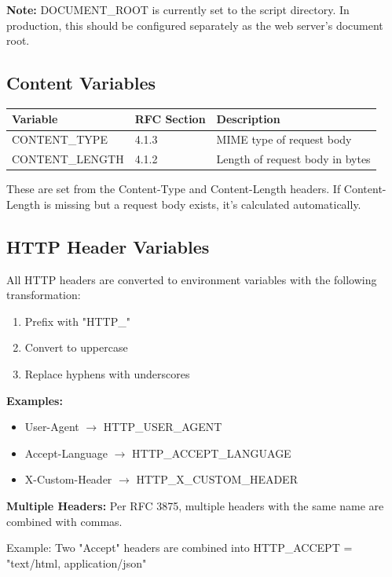 \documentclass[11pt,a4paper]{article}
\begin{document}
\textbf{Note:} DOCUMENT\_ROOT is currently set to the script directory. In production, this should be configured separately as the web server's document root.

\subsection{Content Variables}

\begin{tabular}{|l|l|p{6cm}|}
\hline
\textbf{Variable} & \textbf{RFC Section} & \textbf{Description} \\
\hline
CONTENT\_TYPE & 4.1.3 & MIME type of request body \\
\hline
CONTENT\_LENGTH & 4.1.2 & Length of request body in bytes \\
\hline
\end{tabular}

These are set from the Content-Type and Content-Length headers. If Content-Length is missing but a request body exists, it's calculated automatically.

\subsection{HTTP Header Variables}

All HTTP headers are converted to environment variables with the following transformation:

\begin{enumerate}
    \item Prefix with "HTTP\_"
    \item Convert to uppercase
    \item Replace hyphens with underscores
\end{enumerate}

\textbf{Examples:}
\begin{itemize}
    \item User-Agent $\rightarrow$ HTTP\_USER\_AGENT
    \item Accept-Language $\rightarrow$ HTTP\_ACCEPT\_LANGUAGE
    \item X-Custom-Header $\rightarrow$ HTTP\_X\_CUSTOM\_HEADER
\end{itemize}

\textbf{Multiple Headers:} Per RFC 3875, multiple headers with the same name are combined with commas.

Example: Two "Accept" headers are combined into HTTP\_ACCEPT = "text/html, application/json"
\end{document}
